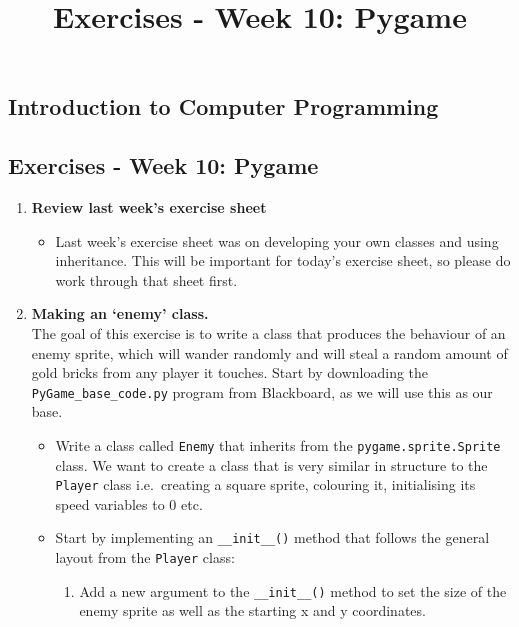 \documentclass[11pt]{report}
\begin{document}
\title{Exercises - Week 10: Pygame}
\subsection*{Introduction to Computer Programming}
\subsection*{Exercises - Week 10: Pygame}
\begin{enumerate}
	\item \textbf{Review last week's exercise sheet}
	\begin{itemize}
		\item Last week's exercise sheet was on developing your own classes
		and using inheritance. This will be important for today's exercise sheet, so please do work through that sheet first.

	\end{itemize}

	\item {\bf Making an `enemy' class.}\\
	The goal of this exercise is to write a class that produces the behaviour of an enemy sprite, which will wander randomly and will steal a random amount of gold bricks from any player it touches. Start by downloading the {\tt PyGame\_base\_code.py} program from Blackboard, as we will use this as our base.
	\begin{itemize}
		\item Write a class called {\tt Enemy} that inherits from the {\tt pygame.sprite.Sprite} class. We want to create a class that is very similar in structure to the {\tt Player} class i.e.\ creating a square sprite, colouring it, initialising its speed variables to $0$ etc.

		\item Start by implementing an \verb|__init__()| method that follows the general layout from the {\tt Player} class:

		\begin{enumerate}
			\item Add a new argument to the \verb|__init__()| method to set the size of the enemy sprite as well as the starting x and y coordinates.


\end{enumerate}
\end{itemize}
\end{enumerate}
\end{document}
